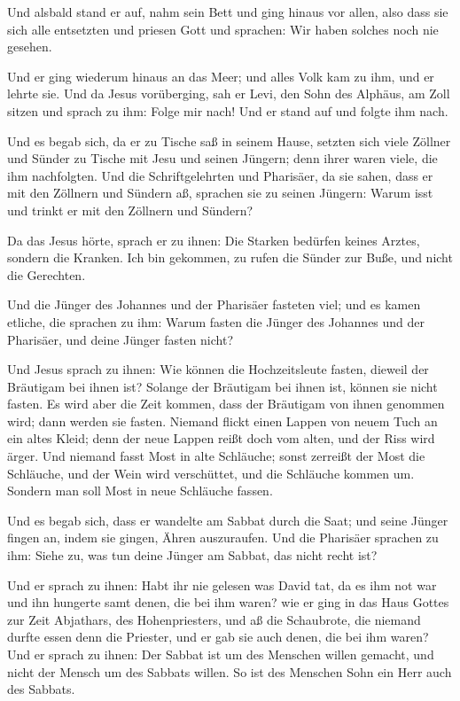  Und alsbald stand er auf, nahm sein Bett und ging hinaus
vor allen, also dass sie sich alle entsetzten und priesen Gott und
sprachen: Wir haben solches noch nie gesehen.

 Und er ging wiederum hinaus an das Meer; und alles Volk
kam zu ihm, und er lehrte sie.  Und da Jesus vorüberging,
sah er Levi, den Sohn des Alphäus, am Zoll sitzen und sprach zu ihm:
Folge mir nach! Und er stand auf und folgte ihm nach.

 Und es begab sich, da er zu Tische saß in seinem Hause,
setzten sich viele Zöllner und Sünder zu Tische mit Jesu und seinen
Jüngern; denn ihrer waren viele, die ihm nachfolgten. 
Und die Schriftgelehrten und Pharisäer, da sie sahen, dass er mit den
Zöllnern und Sündern aß, sprachen sie zu seinen Jüngern: Warum isst und
trinkt er mit den Zöllnern und Sündern?

 Da das Jesus hörte, sprach er zu ihnen: Die Starken
bedürfen keines Arztes, sondern die Kranken. Ich bin gekommen, zu rufen
die Sünder zur Buße, und nicht die Gerechten.

 Und die Jünger des Johannes und der Pharisäer fasteten
viel; und es kamen etliche, die sprachen zu ihm: Warum fasten die Jünger
des Johannes und der Pharisäer, und deine Jünger fasten nicht?

 Und Jesus sprach zu ihnen: Wie können die Hochzeitsleute
fasten, dieweil der Bräutigam bei ihnen ist? Solange der Bräutigam bei
ihnen ist, können sie nicht fasten.  Es wird aber die
Zeit kommen, dass der Bräutigam von ihnen genommen wird; dann werden sie
fasten.  Niemand flickt einen Lappen von neuem Tuch an
ein altes Kleid; denn der neue Lappen reißt doch vom alten, und der Riss
wird ärger.  Und niemand fasst Most in alte Schläuche;
sonst zerreißt der Most die Schläuche, und der Wein wird verschüttet,
und die Schläuche kommen um. Sondern man soll Most in neue Schläuche
fassen.

 Und es begab sich, dass er wandelte am Sabbat durch die
Saat; und seine Jünger fingen an, indem sie gingen, Ähren auszuraufen.
 Und die Pharisäer sprachen zu ihm: Siehe zu, was tun
deine Jünger am Sabbat, das nicht recht ist?

 Und er sprach zu ihnen: Habt ihr nie gelesen was David
tat, da es ihm not war und ihn hungerte samt denen, die bei ihm waren?
 wie er ging in das Haus Gottes zur Zeit Abjathars, des
Hohenpriesters, und aß die Schaubrote, die niemand durfte essen denn die
Priester, und er gab sie auch denen, die bei ihm waren? 
Und er sprach zu ihnen: Der Sabbat ist um des Menschen willen gemacht,
und nicht der Mensch um des Sabbats willen.  So ist des
Menschen Sohn ein Herr auch des Sabbats.


